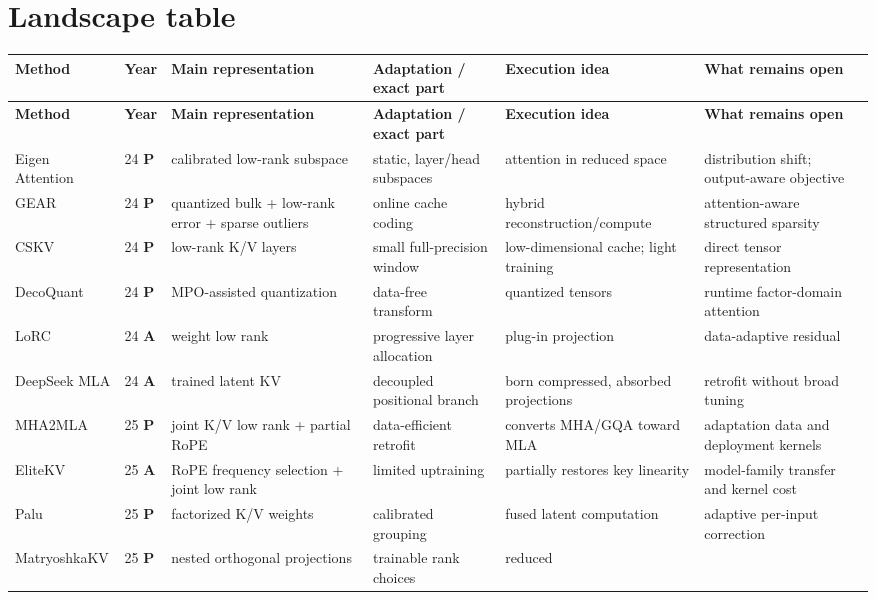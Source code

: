 \documentclass[10pt]{article}
\newcommand{\pub}{\textcolor{green!80!black}{\textbf{P}}}
\newcommand{\pre}{\textcolor{orange!90!black}{\textbf{A}}}
\begin{document}
\section{Landscape table}

\footnotesize
\setlength{\LTpre}{2pt}\setlength{\LTpost}{4pt}
\renewcommand{\arraystretch}{1.15}
\begin{longtable}{@{}P{1.95cm}P{.9cm}P{2.5cm}P{2.55cm}P{2.75cm}P{2.7cm}@{}}
\toprule
\textbf{Method} & \textbf{Year} & \textbf{Main representation} &
\textbf{Adaptation / exact part} & \textbf{Execution idea} & \textbf{What remains open} \\
\midrule
\endfirsthead
\toprule
\textbf{Method} & \textbf{Year} & \textbf{Main representation} &
\textbf{Adaptation / exact part} & \textbf{Execution idea} & \textbf{What remains open} \\
\midrule
\endhead
Eigen Attention & 24 \pub & calibrated low-rank subspace & static, layer/head subspaces &
attention in reduced space & distribution shift; output-aware objective \\
GEAR & 24 \pub & quantized bulk + low-rank error + sparse outliers & online cache coding &
hybrid reconstruction/compute & attention-aware structured sparsity \\
CSKV & 24 \pub & low-rank K/V layers & small full-precision window & low-dimensional cache;
light training & direct tensor representation \\
DecoQuant & 24 \pub & MPO-assisted quantization & data-free transform & quantized tensors &
runtime factor-domain attention \\
LoRC & 24 \pre & weight low rank & progressive layer allocation & plug-in projection &
data-adaptive residual \\
DeepSeek MLA & 24 \pre & trained latent KV & decoupled positional branch & born compressed,
absorbed projections & retrofit without broad tuning \\
MHA2MLA & 25 \pub & joint K/V low rank + partial RoPE & data-efficient retrofit & converts
MHA/GQA toward MLA & adaptation data and deployment kernels \\
EliteKV & 25 \pre & RoPE frequency selection + joint low rank & limited uptraining & partially
restores key linearity & model-family transfer and kernel cost \\
Palu & 25 \pub & factorized K/V weights & calibrated grouping & fused latent computation &
adaptive per-input correction \\
MatryoshkaKV & 25 \pub & nested orthogonal projections & trainable rank choices & reduced

\end{longtable}
\end{document}
